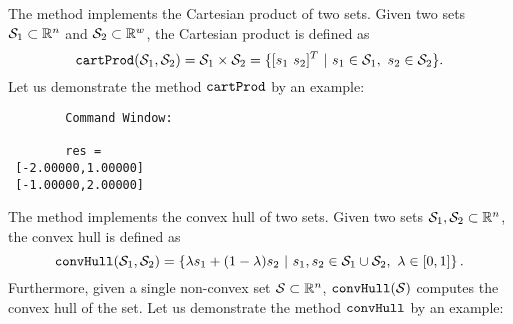 \label{sec:cartProd}

The method  implements the Cartesian product of two sets. Given two sets $\mathcal{S}_1 \subset \mathbb{R}^n$ and $\mathcal{S}_2 \subset \mathbb{R}^w$, the Cartesian product is defined as 
\begin{equation*}
	{\normalfont \texttt{cartProd}}(\mathcal{S}_1,\mathcal{S}_2) = \mathcal{S}_1 \times \mathcal{S}_2 = \{ [s_1 ~ s_2 ]^T ~|~ s_1 \in \mathcal{S}_1,~ s_2 \in \mathcal{S}_2 \}.
\end{equation*}
Let us demonstrate the method ${\normalfont \texttt{cartProd}}$ by an example:

\begin{center}
\begin{minipage}[t]{0.35\textwidth}
	\vspace{10pt}
	\footnotesize
	
\end{minipage}
\begin{minipage}[t]{0.3\textwidth}
	\vspace{10pt}
	\begin{verbatim}
		Command Window:	
	
		res = 
 [-2.00000,1.00000]
 [-1.00000,2.00000]
	\end{verbatim}
\end{minipage}
\begin{minipage}[t]{0.3\textwidth}
	\vspace{0pt}
	\centering
\end{minipage}
\end{center}


\label{sec:convHull}

The method  implements the convex hull of two sets. Given two sets $\mathcal{S}_1,\mathcal{S}_2 \subset \mathbb{R}^n$, the convex hull is defined as 
\begin{equation*}
	{\normalfont \texttt{convHull}}(\mathcal{S}_1,\mathcal{S}_2) = \left \{ \lambda s_1 + (1-\lambda) s_2 ~|~ s_1,s_2 \in \mathcal{S}_1 \cup \mathcal{S}_2,~\lambda \in [0,1] \right\}.
\end{equation*}
Furthermore, given a single non-convex set $\mathcal{S} \subset \mathbb{R}^n$, ${\normalfont \texttt{convHull}}(\mathcal{S})$ computes the convex hull of the set. Let us demonstrate the method ${\normalfont \texttt{convHull}}$ by an example:

\begin{center}
\begin{minipage}[t]{0.35\textwidth}
	\vspace{10pt}
	\footnotesize
	
\end{minipage}
\begin{minipage}[t]{0.6\textwidth}
	\vspace{0pt}
	\centering
\end{minipage}
\end{center}



